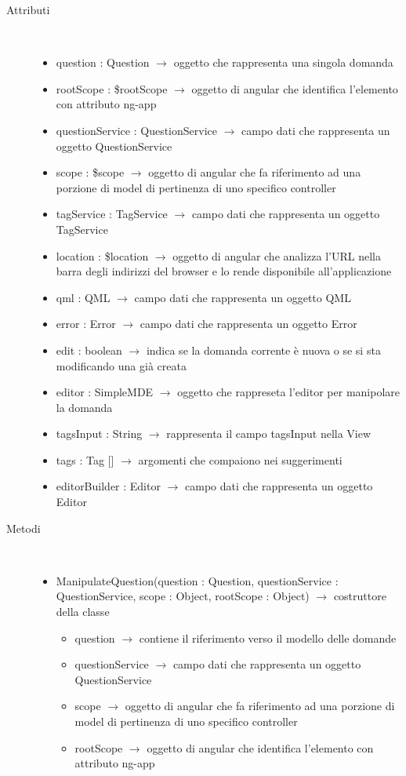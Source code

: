 \begin{description}
\item[Attributi] \hfill \\
\vspace{-7mm}
\begin{itemize}
	\item question : Question  $\rightarrow$ oggetto che rappresenta una singola domanda
	\item rootScope : \$rootScope $\rightarrow$ oggetto di angular che identifica l’elemento con attributo ng-app
	\item questionService : QuestionService $\rightarrow$ campo dati che rappresenta un oggetto QuestionService
	\item scope : \$scope $\rightarrow$ oggetto di angular che fa riferimento ad una porzione di model di pertinenza di uno specifico controller
	\item tagService : TagService $\rightarrow$ campo dati che rappresenta un oggetto TagService
	\item location : \$location $\rightarrow$ oggetto di angular che analizza l'URL nella barra degli indirizzi del browser e lo rende disponibile all'applicazione
	\item qml : QML $\rightarrow$ campo dati che rappresenta un oggetto QML
	\item error : Error $\rightarrow$ campo dati che rappresenta un oggetto Error
	\item edit : boolean $\rightarrow$ indica se la domanda corrente è nuova o se si sta modificando una già creata
	\item editor : SimpleMDE $\rightarrow$ oggetto che rappreseta l'editor per manipolare la domanda
	\item tagsInput : String $\rightarrow$ rappresenta il campo tagsInput nella View
	\item tags : Tag [] $\rightarrow$ argomenti che compaiono nei suggerimenti
	\item editorBuilder : Editor $\rightarrow$ campo dati che rappresenta un oggetto Editor
\end{itemize}

\item[Metodi] \hfill \\
\vspace{-7mm}
\begin{itemize}
	\item ManipulateQuestion(question : Question, questionService : QuestionService, scope : Object, rootScope : Object) $\rightarrow$ costruttore della classe\begin{itemize}
		\item question $\rightarrow$ contiene il riferimento verso il modello delle domande 
		\item questionService $\rightarrow$ campo dati che rappresenta un oggetto QuestionService
		\item scope $\rightarrow$ oggetto di angular che fa riferimento ad una porzione di model di pertinenza di uno specifico controller
		\item rootScope $\rightarrow$ oggetto di angular che identifica l’elemento con attributo ng-app
	\end{itemize}
	

\end{itemize}
\end{description}
